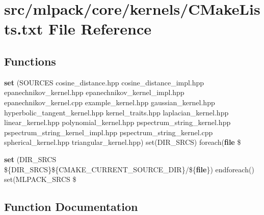 \section{src/mlpack/core/kernels/\+C\+Make\+Lists.txt File Reference}
\label{core_2kernels_2CMakeLists_8txt}
\subsection*{Functions}
\begin{DoxyCompactItemize}
\item 
{\bf set} (S\+O\+U\+R\+C\+ES cosine\+\_\+distance.\+hpp cosine\+\_\+distance\+\_\+impl.\+hpp epanechnikov\+\_\+kernel.\+hpp epanechnikov\+\_\+kernel\+\_\+impl.\+hpp epanechnikov\+\_\+kernel.\+cpp example\+\_\+kernel.\+hpp gaussian\+\_\+kernel.\+hpp hyperbolic\+\_\+tangent\+\_\+kernel.\+hpp kernel\+\_\+traits.\+hpp laplacian\+\_\+kernel.\+hpp linear\+\_\+kernel.\+hpp polynomial\+\_\+kernel.\+hpp pspectrum\+\_\+string\+\_\+kernel.\+hpp pspectrum\+\_\+string\+\_\+kernel\+\_\+impl.\+hpp pspectrum\+\_\+string\+\_\+kernel.\+cpp spherical\+\_\+kernel.\+hpp triangular\+\_\+kernel.\+hpp) set(D\+I\+R\+\_\+\+S\+R\+CS) foreach({\bf file} \$
\item 
{\bf set} (D\+I\+R\+\_\+\+S\+R\+CS \$\{D\+I\+R\+\_\+\+S\+R\+CS\}\$\{C\+M\+A\+K\+E\+\_\+\+C\+U\+R\+R\+E\+N\+T\+\_\+\+S\+O\+U\+R\+C\+E\+\_\+\+D\+IR\}/\$\{{\bf file}\}) endforeach() set(M\+L\+P\+A\+C\+K\+\_\+\+S\+R\+CS \$
\end{DoxyCompactItemize}


\subsection{Function Documentation}
